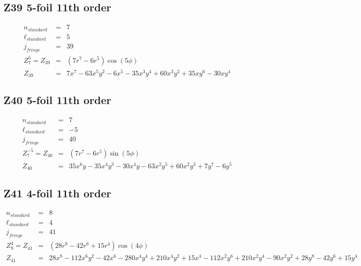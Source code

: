 \documentclass[10pt]{article}
\begin{document}
  \subsection{Z39 5-foil 11th order}
    \begin{subequations}
    \begin{eqnarray}
        n_{standard} &=&7\\
        \ell_{standard} &=&5\\
        j_{fringe} &=&39\\
        Z_{7}^{5} = Z_{39} &=& \left(7 r^{7} - 6 r^{5}\right) \cos{\left(5 \phi \right)}\\
        Z_{39} &=& 7 x^{7} - 63 x^{5} y^{2} - 6 x^{5} - 35 x^{3} y^{4} + 60 x^{3} y^{2} + 35 x y^{6} - 30 x y^{4}
    \end{eqnarray}
    \end{subequations}
  \subsection{Z40 5-foil 11th order}
    \begin{subequations}
    \begin{eqnarray}
        n_{standard} &=&7\\
        \ell_{standard} &=&-5\\
        j_{fringe} &=&40\\
        Z_{7}^{-5} = Z_{40} &=& \left(7 r^{7} - 6 r^{5}\right) \sin{\left(5 \phi \right)}\\
        Z_{40} &=& 35 x^{6} y - 35 x^{4} y^{3} - 30 x^{4} y - 63 x^{2} y^{5} + 60 x^{2} y^{3} + 7 y^{7} - 6 y^{5}
    \end{eqnarray}
    \end{subequations}
  \subsection{Z41 4-foil 11th order}
    \begin{subequations}
    \begin{eqnarray}
        n_{standard} &=&8\\
        \ell_{standard} &=&4\\
        j_{fringe} &=&41\\
        Z_{8}^{4} = Z_{41} &=& \left(28 r^{8} - 42 r^{6} + 15 r^{4}\right) \cos{\left(4 \phi \right)}\\
        Z_{41} &=& 28 x^{8} - 112 x^{6} y^{2} - 42 x^{6} - 280 x^{4} y^{4} + 210 x^{4} y^{2} + 15 x^{4} - 112 x^{2} y^{6} + 210 x^{2} y^{4} - 90 x^{2} y^{2} + 28 y^{8} - 42 y^{6} + 15 y^{4}
    \end{eqnarray}
    \end{subequations}
\end{document}
